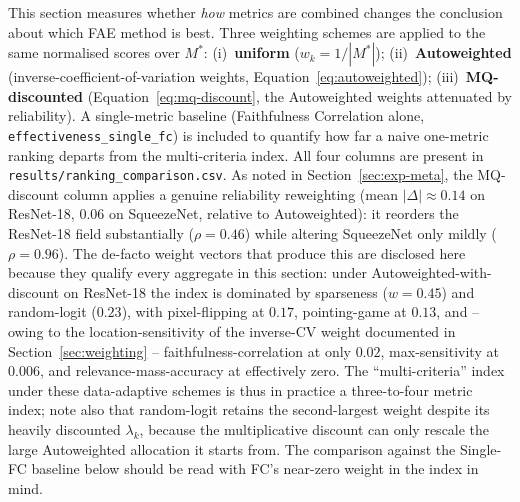 This section measures whether \emph{how} metrics are combined changes the
conclusion about which FAE method is best. Three weighting schemes are applied
to the same normalised scores over $M^{*}$:
(i)~\textbf{uniform} ($w_k = 1/|M^{*}|$);
(ii)~\textbf{Autoweighted} (inverse-coefficient-of-variation weights,
Equation~\eqref{eq:autoweighted});
(iii)~\textbf{MQ-discounted} (Equation~\eqref{eq:mq-discount}, the
Autoweighted weights attenuated by reliability). A single-metric baseline
(Faithfulness Correlation
alone, \texttt{effectiveness\_single\_fc}) is included to quantify how far a
naive one-metric ranking departs from the multi-criteria index. All four columns
are present in \texttt{results/ranking\_comparison.csv}. As noted in
Section~\ref{sec:exp-meta}, the MQ-discount column applies a genuine
reliability reweighting (mean $|\Delta|\approx0.14$ on ResNet-18, $0.06$ on
SqueezeNet, relative to Autoweighted):
it reorders the ResNet-18 field substantially ($\rho = 0.46$) while altering
SqueezeNet only mildly ($\rho = 0.96$). The de-facto weight vectors that
produce this are disclosed here because they qualify every aggregate in
this section: under Autoweighted-with-discount on ResNet-18 the index is
dominated by sparseness ($w = 0.45$) and random-logit ($0.23$), with
pixel-flipping at $0.17$, pointing-game at $0.13$, and -- owing to the
location-sensitivity of the inverse-CV weight documented in
Section~\ref{sec:weighting} -- faithfulness-correlation at only $0.02$,
max-sensitivity at $0.006$, and
relevance-mass-accuracy at effectively zero. The ``multi-criteria'' index
under these data-adaptive schemes is thus in practice a three-to-four
metric index; note also that random-logit retains the second-largest
weight despite its heavily discounted $\lambda_k$, because the
multiplicative discount can only rescale the large Autoweighted allocation
it starts from. The comparison against the Single-FC baseline below
should be read with FC's near-zero weight in the index in mind.

